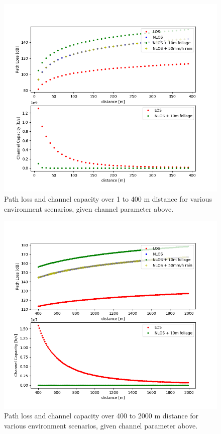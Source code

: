 \begin{figure}[htb]
    \begin{center}
        \includegraphics[width=0.9\linewidth]{smba_sim_1}
        \caption{Path loss and channel capacity over 1 to 400 m distance for various environment scenarios, 
        given channel parameter above.}
        \label{fig:sim_1}
    \end{center}
\end{figure}
\begin{figure}[htb]
    \begin{center}
    \includegraphics[width=0.9\linewidth]{smba_sim_2}
        \caption{Path loss and channel capacity over 400 to 2000 m distance for various environment scenarios, 
        given channel parameter above.}
        \label{fig:sim_2}
    \end{center}
\end{figure}
